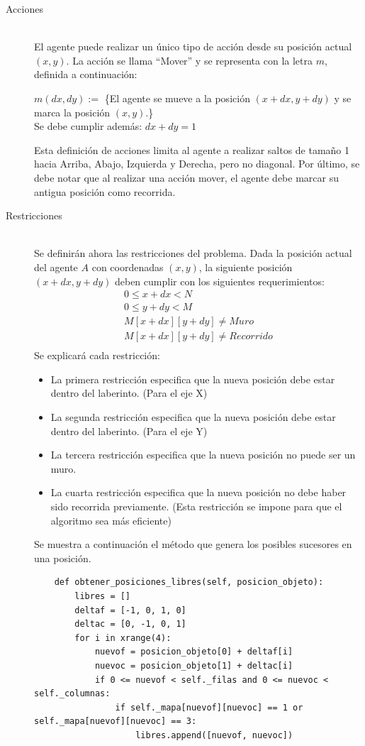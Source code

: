 \documentclass[letter, titlepage, 10pt]{article}
\begin{document}
\begin{description}
    \item[Acciones] \hfill \\
  El agente puede realizar un único tipo de acción desde su posición actual $(x,y)$. La acción se llama ``Mover'' y se representa con la letra $m$, definida a continuación:
  \begin{center}
    $m(dx,dy) :=$ \{El agente se mueve a la posición $(x+dx,y+dy)$ y se marca la posición $(x,y)$.\}\\
    Se debe cumplir además: $dx + dy = 1$\\
  \end{center}
  Esta definición de acciones limita al agente a realizar saltos de tamaño 1 hacia Arriba, Abajo, Izquierda y Derecha, pero no diagonal. Por último, se debe notar que al realizar una acción mover, el agente debe marcar su antigua posición como recorrida.
  
  \item[Restricciones] \hfill \\
    Se definirán ahora las restricciones del problema. Dada la posición actual del agente $A$ con coordenadas $(x,y)$, la siguiente posición $(x+dx,y+dy)$  deben cumplir con los siguientes requerimientos:
  \begin{align}
    0 \leq x+dx < N\\
    0 \leq y+dy < M\\
    M[x+dx][y+dy] \neq Muro\\
    M[x+dx][y+dy] \neq Recorrido\\
  \end{align}
  Se explicará cada restricción:
  \begin{itemize}
    \item La primera restricción especifica que la nueva posición debe estar dentro del laberinto. (Para el eje X)
    \item La segunda restricción especifica que la nueva posición debe estar dentro del laberinto. (Para el eje Y)
    \item La tercera restricción especifica que la nueva posición no puede ser un muro.
    \item La cuarta restricción especifica que la nueva posición no debe haber sido recorrida previamente. (Esta restricción se impone para que el algoritmo sea más eficiente)
  \end{itemize}

Se muestra a continuación el método que genera los posibles sucesores en una posición.

  \begin{lstlisting}
    def obtener_posiciones_libres(self, posicion_objeto):
        libres = []
        deltaf = [-1, 0, 1, 0]
        deltac = [0, -1, 0, 1]
        for i in xrange(4):
            nuevof = posicion_objeto[0] + deltaf[i]
            nuevoc = posicion_objeto[1] + deltac[i]
            if 0 <= nuevof < self._filas and 0 <= nuevoc < self._columnas:
                if self._mapa[nuevof][nuevoc] == 1 or self._mapa[nuevof][nuevoc] == 3:
                    libres.append([nuevof, nuevoc])


\end{lstlisting}
\end{description}
\end{document}
